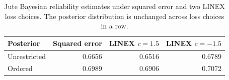 \begin{table}[htbp]
\centering
\caption{Jute Bayesian reliability estimates under squared error and two LINEX loss choices. The posterior distribution is unchanged across loss choices in a row.}\label{tab:loss}
\small
\begin{tabular}{lrrr}
\toprule
Posterior & Squared error & LINEX $c=1.5$ & LINEX $c=-1.5$ \\
\midrule
Unrestricted & 0.6656 & 0.6516 & 0.6789 \\
Ordered & 0.6989 & 0.6906 & 0.7072 \\
\bottomrule
\end{tabular}
\end{table}
